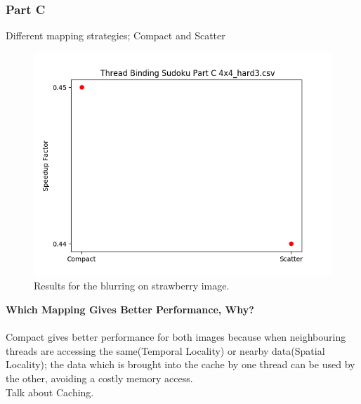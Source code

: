 \documentclass{article}
\newcommand\tab[1][0.5cm]{\hspace*{#1}}
\begin{document}
\subsubsection{Part C}
\begin{description}
    \item[Different mapping strategies; Compact and Scatter]
\end{description}
\begin{figure}[!htb]
    \centering
    \includegraphics[width=1\linewidth]{./img/binding_part_2_C.png}
    \caption{Results for the blurring on strawberry image.}
\end{figure}
\textbf{Which Mapping Gives Better Performance, Why?}\\
\\ \tab Compact gives better performance for both images because 
when neighbouring threads are accessing the same(Temporal Locality) or nearby data(Spatial Locality);
the data which is brought into the cache by one thread can be used 
by the other, avoiding a costly memory access.
\\ Talk about Caching.

\newpage
\end{document}
